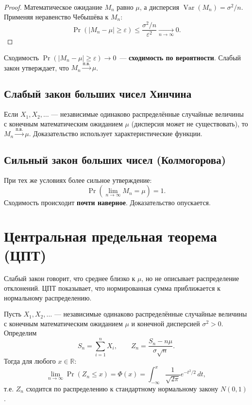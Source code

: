 \documentclass[10pt]{article}
\begin{document}
\begin{proof}
Математическое ожидание $M_n$ равно $\mu$, а дисперсия $\operatorname{Var}(M_n) = \sigma^2/n$. Применяя неравенство Чебышёва к $M_n$:
\[
\Pr(|M_n - \mu| \ge \varepsilon) \le \frac{\sigma^2/n}{\varepsilon^2} \xrightarrow[n\to\infty]{} 0.
\]
\end{proof}

\begin{corollary}
Сходимость $\Pr(|M_n - \mu| \ge \varepsilon) \to 0$~--- \textbf{сходимость по вероятности}. Слабый закон утверждает, что $M_n \xrightarrow{\text{п.в.}} \mu$.
\end{corollary}

\subsection{Слабый закон больших чисел Хинчина}
Если $X_1, X_2, \dots$ — независимые одинаково распределённые случайные величины с конечным математическим ожиданием $\mu$ (дисперсия может не существовать), то $M_n \xrightarrow{\text{п.в.}} \mu$. Доказательство использует характеристические функции.

\subsection{Сильный закон больших чисел (Колмогорова)}
При тех же условиях более сильное утверждение:
\[
\Pr\!\left(\lim_{n\to\infty} M_n = \mu\right) = 1.
\]
Сходимость происходит \textbf{почти наверное}. Доказательство опускается.

\section{Центральная предельная теорема (ЦПТ)}

Слабый закон говорит, что среднее близко к $\mu$, но не описывает распределение отклонений. ЦПТ показывает, что нормированная сумма приближается к нормальному распределению.

\begin{theorem}
Пусть $X_1, X_2, \dots$ — независимые одинаково распределённые случайные величины с конечным математическим ожиданием $\mu$ и конечной дисперсией $\sigma^2 > 0$. Определим
\[
S_n = \sum_{i=1}^n X_i, \qquad Z_n = \frac{S_n - n\mu}{\sigma\sqrt{n}}.
\]
Тогда для любого $x \in \mathbb{R}$:
\[
\lim_{n\to\infty} \Pr(Z_n \le x) = \Phi(x) = \int_{-\infty}^x \frac{1}{\sqrt{2\pi}} e^{-t^2/2}\,dt,
\]
т.е. $Z_n$ сходится по распределению к стандартному нормальному закону $N(0,1)$.
\end{theorem}
\end{document}
